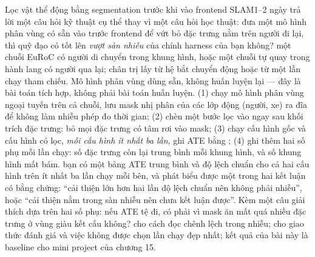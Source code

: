 \documentclass[../../deep_learning.tex]{subfiles}
\begin{document}
\begin{ungdung}
\end{ungdung}

\begin{duan}{Lọc vật thể động bằng segmentation trước khi vào frontend SLAM}{1--2 ngày}
\dmt trả lời một câu hỏi kỹ thuật cụ thể thay vì một câu hỏi học thuật: đưa một mô hình phân vùng có sẵn vào trước frontend để vứt bỏ đặc trưng nằm trên người đi lại, thì quỹ đạo có tốt lên \emph{vượt sàn nhiễu} của chính harness của bạn không?
\ddl một chuỗi EuRoC có người di chuyển trong khung hình, hoặc một chuỗi tự quay trong hành lang có người qua lại; chân trị lấy từ hệ bắt chuyển động hoặc từ một lần chạy tham chiếu. Mô hình phân vùng dùng sẵn, không huấn luyện lại --- đây là bài toán tích hợp, không phải bài toán huấn luyện.
\dbc (1) chạy mô hình phân vùng ngoại tuyến trên cả chuỗi, lưu mask nhị phân của các lớp động (người, xe) ra đĩa để không làm nhiễu phép đo thời gian; (2) chèn một bước lọc vào ngay sau khối trích đặc trưng: bỏ mọi đặc trưng có tâm rơi vào mask; (3) chạy cấu hình gốc và cấu hình có lọc, \emph{mỗi cấu hình ít nhất ba lần}, ghi ATE bằng ; (4) ghi thêm hai số phụ mỗi lần chạy: số đặc trưng còn lại trung bình mỗi khung hình, và số khung hình mất bám.
\dxk bạn có một bảng ATE trung bình và độ lệch chuẩn cho cả hai cấu hình trên ít nhất ba lần chạy mỗi bên, và phát biểu được một trong hai kết luận có bằng chứng: ``cải thiện lớn hơn hai lần độ lệch chuẩn nên không phải nhiễu'', hoặc ``cải thiện nằm trong sàn nhiễu nên chưa kết luận được''. Kèm một câu giải thích dựa trên hai số phụ: nếu ATE tệ đi, có phải vì mask ăn mất quá nhiều đặc trưng ở vùng giàu kết cấu không?
\dnv {} cho cách đọc chênh lệch trong nhiễu;  cho giao thức đánh giá và việc không được chọn lần chạy đẹp nhất; kết quả của bài này là baseline cho mini project của chương 15.
\end{duan}
\end{document}
